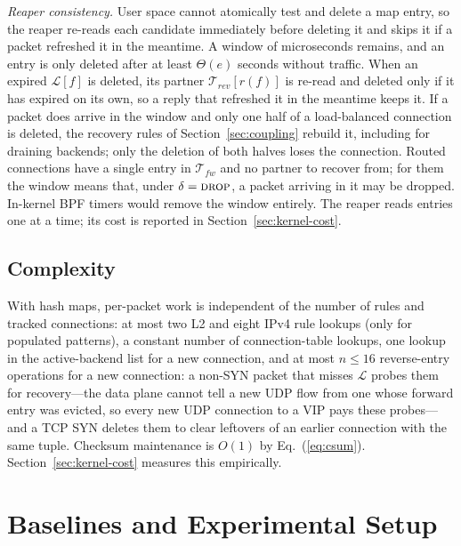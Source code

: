 \documentclass[conference]{IEEEtran}
\begin{document}
\textit{Reaper consistency.}
\label{sec:reaper}
User space cannot atomically test and delete a map entry, so the reaper
re-reads each candidate immediately before deleting it and skips it if a
packet refreshed it in the meantime. A window of microseconds remains, and an
entry is only deleted after at least $\Theta(e)$ seconds without traffic.
When an expired $\mathcal{L}[f]$ is deleted, its partner
$\mathcal{T}_{rev}[r(f)]$ is re-read and deleted only if it has expired on its
own, so a reply that refreshed it in the meantime keeps it. If a packet does
arrive in the window and only one half of a load-balanced connection is
deleted, the recovery rules of Section~\ref{sec:coupling} rebuild it,
including for draining backends; only the deletion of both halves loses the
connection. Routed connections have a single entry in $\mathcal{T}_{fw}$ and
no partner to recover from; for them the window means that, under
$\delta=\textsc{drop}$, a packet arriving in it may be dropped. In-kernel BPF timers would remove the window entirely.
The reaper reads entries one at a time; its cost is reported in
Section~\ref{sec:kernel-cost}.

\subsection{Complexity}
\label{sec:complexity}
With hash maps, per-packet work is independent of the number of rules and
tracked connections: at most two L2 and eight IPv4 rule lookups (only for
populated patterns), a constant number of connection-table lookups, one
lookup in the active-backend list for a new connection, and at most $n \le 16$
reverse-entry operations for a new connection: a non-SYN packet that misses
$\mathcal{L}$ probes them for recovery---the data plane cannot tell a new UDP
flow from one whose forward entry was evicted, so every new UDP connection to
a VIP pays these probes---and a TCP SYN deletes them to clear leftovers of an
earlier connection with the same tuple. Checksum
maintenance is $O(1)$ by Eq.~(\ref{eq:csum}). Section~\ref{sec:kernel-cost}
measures this empirically.

\section{Baselines and Experimental Setup}
\label{sec:setup}
\end{document}
